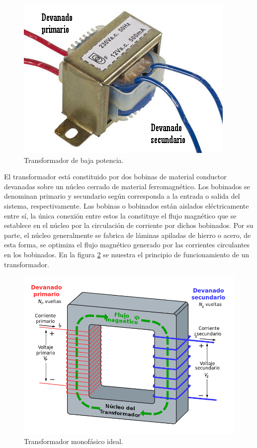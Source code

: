 \begin{figure}[h]
	\centering
	\includegraphics[scale=.5]{./Figures/transformador.jpg}
	\caption{Transformador de baja potencia\protect\footnotemark.}
	\label{fig:figTransformador}
\end{figure}


El transformador está constituido por dos bobinas de material conductor devanadas sobre un núcleo cerrado de material ferromagnético. Los bobinados se denominan primario y secundario según corresponda a la entrada o salida del sistema, respectivamente. Las bobinas o bobinados están aislados eléctricamente entre sí, la única conexión entre estos la constituye el flujo magnético que se establece en el núcleo por la circulación de corriente por dichos bobinados. Por su parte, el núcleo generalmente se fabrica de láminas apiladas de hierro o acero, de esta forma, se optimiza el flujo magnético generado por las corrientes circulantes en los bobinados. En la figura \ref{fig:figTransformador2} se muestra el principio de funcionamiento de un transformador.

\begin{figure}[htpb]
	\centering
	\includegraphics[scale=.3]{./Figures/transformador_2.png}
	\caption{Transformador monofásico ideal\protect\footnotemark.}
	\label{fig:figTransformador2}
\end{figure}

